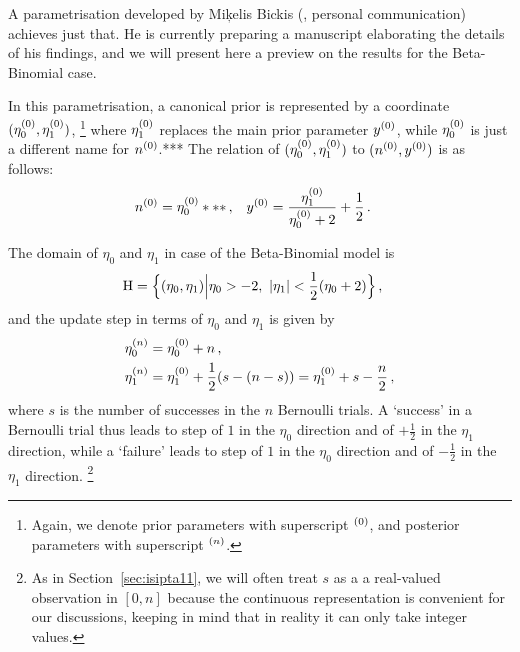 A parametrisation developed by Mi\c{k}elis Bickis (\cite*{2011:bickis:geomip}, personal communication) achieves just that.
He is currently preparing a manuscript elaborating the details of his findings,
and we will present here a preview on the results for the Beta-Binomial case.

In this parametrisation, a canonical prior is represented by a coordinate $(\eta_0^{(0)},\eta_1^{(0)})$,%
\footnote{Again, we denote prior parameters with superscript ${}^{(0)}$, and posterior parameters with superscript ${}^{(n)}$.}
where $\eta_1^{(0)}$ replaces the main prior parameter $y^{(0)}$,
while $\eta_0^{(0)}$ is just a different name for $n^{(0)}$.***
The relation of $(\eta_0^{(0)},\eta_1^{(0)})$ to $(n^{(0)}, y^{(0)})$ is as follows:
\begin{align}
\label{eq:trafotony}
n^{(0)} &= \eta_0^{(0)} ***\,, &
y^{(0)} &= \frac{\eta_1^{(0)}}{\eta_0^{(0)} + 2} + \frac{1}{2}\,.
\end{align}

The domain of $\eta_0$ and $\eta_1$ in case of the Beta-Binomial model is
\begin{align}
\label{eq:eta-domain}
\mathrm{H} &= \Big\{ (\eta_0,\eta_1) \Big| \eta_0 > -2,\ |\eta_1| < \frac{1}{2}(\eta_0 + 2) \Big.\Big\}\,,
\end{align}
and the update step in terms of $\eta_0$ and $\eta_1$ is given by
\begin{equation}
\label{eq:eta-update}
\begin{aligned}
\eta_0^{(n)} &= \eta_0^{(0)} + n\,, \\
\eta_1^{(n)} &= \eta_1^{(0)} + \frac{1}{2}(s - (n-s)) = \eta_1^{(0)} + s - \frac{n}{2}\,,
\end{aligned}
\end{equation}
where $s$ is the number of successes in the $n$ Bernoulli trials.
A `success' in a Bernoulli trial thus
leads to step of $1$ in the $\eta_0$ direction and of $+\frac{1}{2}$ in the $\eta_1$ direction,
while a `failure'
leads to step of $1$ in the $\eta_0$ direction and of $-\frac{1}{2}$ in the $\eta_1$ direction.%
\footnote{As in Section~\ref{sec:isipta11}, we  
will often treat $s$ as a a real-valued observation in $[0,n]$
because the continuous representation is convenient for our discussions,
keeping in mind that in reality it can only take integer values.}

